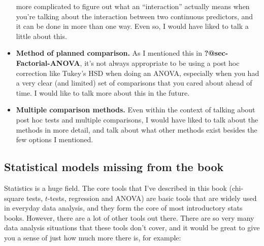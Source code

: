 \documentclass[
  a4paper,
]{book}
\begin{document}
\begin{itemize}
  more complicated to figure out what an ``interaction'' actually means
  when you're talking about the interaction between two continuous
  predictors, and it can be done in more than one way. Even so, I would
  have liked to talk a little about this.
\item
  \textbf{Method of planned comparison.} As I mentioned this in
  \textbf{?@sec-Factorial-ANOVA}, it's not always appropriate to be
  using a post hoc correction like Tukey's HSD when doing an ANOVA,
  especially when you had a very clear (and limited) set of comparisons
  that you cared about ahead of time. I would like to talk more about
  this in the future.
\item
  \textbf{Multiple comparison methods.} Even within the context of
  talking about post hoc tests and multiple comparisons, I would have
  liked to talk about the methods in more detail, and talk about what
  other methods exist besides the few options I mentioned.
\end{itemize}

\hypertarget{statistical-models-missing-from-the-book}{%
\subsection*{Statistical models missing from the
book}\label{statistical-models-missing-from-the-book}}

Statistics is a huge field. The core tools that I've described in this
book (chi-square tests, \(t\)-tests, regression and ANOVA) are basic
tools that are widely used in everyday data analysis, and they form the
core of most introductory stats books. However, there are a lot of other
tools out there. There are so very many data analysis situations that
these tools don't cover, and it would be great to give you a sense of
just how much more there is, for example:
\end{document}
